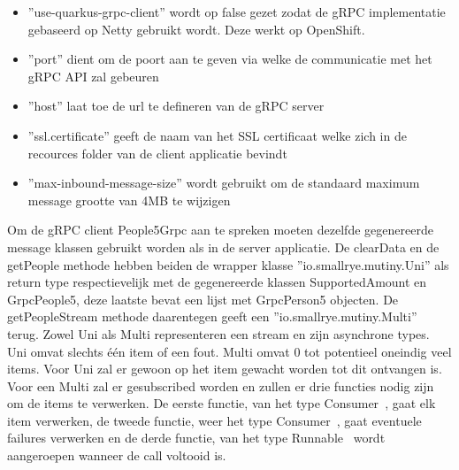 \begin{itemize}
    \item ''use-quarkus-grpc-client'' wordt op false gezet zodat de gRPC implementatie gebaseerd op Netty gebruikt wordt. Deze werkt op OpenShift.
    \item ''port'' dient om de poort aan te geven via welke de communicatie met het gRPC API zal gebeuren
    \item ''host'' laat toe de url te defineren van de gRPC server
    \item ''ssl.certificate'' geeft de naam van het SSL certificaat welke zich in de recources folder van de client applicatie bevindt
    \item ''max-inbound-message-size'' wordt gebruikt om de standaard maximum message grootte van 4MB te wijzigen
\end{itemize}

Om de gRPC client People5Grpc aan te spreken moeten dezelfde gegenereerde message klassen gebruikt worden als in de server applicatie.
De clearData en de getPeople methode hebben beiden de wrapper klasse ''io.smallrye.mutiny.Uni'' als return type respectievelijk met de gegenereerde klassen
SupportedAmount en GrpcPeople5, deze laatste bevat een lijst met GrpcPerson5 objecten. De getPeopleStream methode daarentegen geeft een ''io.smallrye.mutiny.Multi'' terug.
Zowel Uni als Multi representeren een stream en zijn asynchrone types. Uni omvat slechts \'e\'en item of een fout. Multi omvat 0 tot potentieel oneindig veel items.
Voor Uni zal er gewoon op het item gewacht worden tot dit ontvangen is. Voor een Multi zal er gesubscribed worden en zullen er drie functies nodig zijn om
de items te verwerken. De eerste functie, van het type Consumer~\parencite{Consumer}, gaat elk item verwerken, de tweede functie, weer het type Consumer~\parencite{Consumer},
gaat eventuele failures verwerken en de derde functie, van het type Runnable~\parencite{Runnable} wordt aangeroepen wanneer de call voltooid is.\newline
~\autocite{quarkusgRPCclient}\\
~\autocite{SmallRyeMutiny}\\
~\autocite{MultiSubscribing}\\

